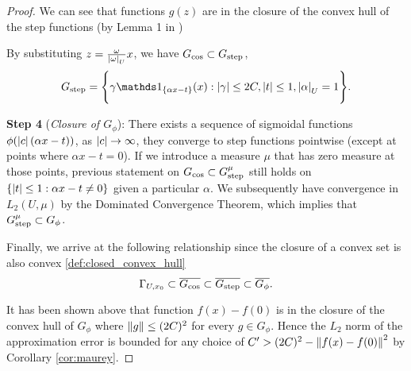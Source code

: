 \begin{proof}
    We can see that functions $g(z)$ are in the closure of the convex hull of
    the step functions (by Lemma 1 in
    \cite{barronUniversalApproximationBounds1993})

    By substituting $z = \frac{\omega}{\left| \omega \right|_{U}} x$, we have $G_{\cos}
    \subset G_{\textnormal{step}}$,
    \begin{equation}
        G_{\textnormal{step}} = \Bigg\{
            \gamma\indicator{\{\alpha x-t\}}(x):
            \abs{\gamma} \leq 2C,
            \abs{t} \leq 1,
            \abs{\alpha}_{U} = 1
        \Bigg\}.
    \end{equation}

    \textbf{Step 4} (\textit{Closure of $G_{\phi}$}): There exists a sequence of
    sigmoidal functions $\phi(\left| c \right|(\alpha x - t))$, as $\left| c \right| \to \infty$,
    they converge to step functions pointwise (except at points where $\alpha x
    - t = 0$). If we introduce a measure $\mu$ that has zero measure at those
    points, previous statement on $G_{\cos} \subset G^{\mu}_{\textnormal{step}}$
    still holds on $\{\left| t \right| \leq 1: \alpha x - t \not=0\}$ given a particular
    $\alpha$. We subsequently have convergence in $L_2(U, \mu)$ by the Dominated
    Convergence Theorem, which implies that $G^{\mu}_{\textnormal{step}} \subset
    G_{\phi}$.

    Finally, we arrive at the following relationship since the closure of a
    convex set is also convex \eqref{def:closed_convex_hull}
    \begin{equation*}
        \Gamma_{U, x_0} \subset \overline{G_{\cos}} 
        \subset \overline{G_{\textnormal{step}}} \subset \overline{G_{\phi}}.
    \end{equation*}




    It has been shown above that function $f(x) - f(0)$ is in the closure of
    the convex hull of $G_{\phi}$ where $\left\| g \right\| \leq (2C)^2$ for every $g \in
    G_{\phi}$. Hence the $L_2$ norm of the approximation error is bounded for
    any choice of $C' > (2C)^2 - \left\| f(x) - f(0) \right\|^2$ by Corollary
    \ref{cor:maurey}.




\end{proof}


